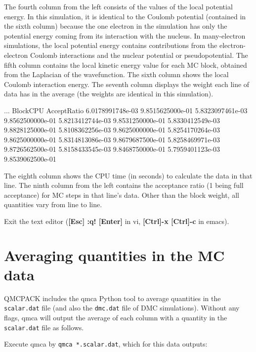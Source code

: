 The fourth column from the left consists of the values of the local potential
energy.  In this simulation, it is identical to the Coulomb potential
(contained in the sixth column) because the one electron in the simulation has
only the potential energy coming from its interaction with the nucleus.  In
many-electron simulations, the local potential energy contains contributions
from the electron-electron Coulomb interactions and the nuclear potential or
pseudopotential.  The fifth column contains the local kinetic energy value for
each MC block, obtained from the Laplacian of the wavefunction.  The sixth
column shows the local Coulomb interaction energy.  The seventh column displays
the weight each line of data has in the average (the weights are identical in
this simulation).   

\begin{shade} 
...    BlockCPU            AcceptRatio         
       6.0178991748e-03    9.8515625000e-01
       5.8323097461e-03    9.8562500000e-01
       5.8213412744e-03    9.8531250000e-01
       5.8330412549e-03    9.8828125000e-01
       5.8108362256e-03    9.8625000000e-01
       5.8254170264e-03    9.8625000000e-01
       5.8314813086e-03    9.8679687500e-01
       5.8258469971e-03    9.8726562500e-01
       5.8158433545e-03    9.8468750000e-01
       5.7959401123e-03    9.8539062500e-01
\end{shade}

The eighth column shows the CPU time (in seconds) to calculate the data in that
line.  The ninth column from the left contains the acceptance ratio (1 being
full acceptance) for MC steps in that line's data.  Other than the
block weight, all quantities vary from line to line.

Exit the text editor (\textbf{[Esc] :q! [Enter]} in vi, \textbf{[Ctrl]-x [Ctrl]-c} in
emacs).

\section{Averaging quantities in the MC data}
\label{sec:averaging} 

QMCPACK includes the qmca Python tool to average quantities in the \texttt{scalar.dat} file (and
also the \texttt{dmc.dat} file of DMC simulations).  Without any flags, qmca will output
the average of each column with a quantity in the \texttt{scalar.dat} file as follows. 

Execute qmca by \texttt{qmca *.scalar.dat}, which for this data outputs:

